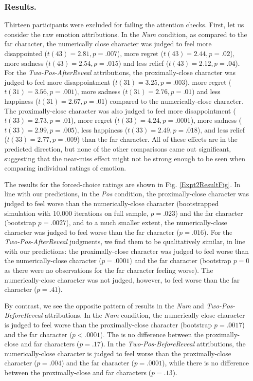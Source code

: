 \documentclass[10pt,letterpaper]{article}
\begin{document}
\subsubsection{Results.} Thirteen participants were excluded for failing the attention checks.
First, let us consider the raw emotion attributions. In the \textit{Num} condition, as compared to the far character, the numerically close character was judged to feel more disappointed ($t(43)=2.81, p=.007$), more regret ($t(43)=2.44, p=.02$), more sadness ($t(43)=2.54, p=.015$) and less relief ($t(43)=2.12, p=.04$). For the \textit{Two-Pos-AfterReveal} attributions, the proximally-close character was judged to feel more disappointment ($t(31)=3.25, p=.003$), more regret ($t(31)=3.56, p=.001$), more sadness ($t(31)=2.76, p=.01$) and less happiness ($t(31)=2.67, p=.01$) compared to the numerically-close character. The proximally-close character was also judged to feel more disappointment ($t(33)=2.73, p=.01$), more regret ($t(33)=4.24, p=.0001$), more sadness ($t(33)=2.99, p=.005$), less happiness ($t(33)=2.49, p=.018$), and less relief ($t(33)=2.77, p=.009$) than the far character. All of these effects are in the predicted direction, but none of the other comparisons came out significant, suggesting that the near-miss effect might not be strong enough to be seen when comparing individual ratings of emotion.




The results for the forced-choice ratings are shown in Fig. \ref{Expt2ResultFig}. In line with our predictions, in the \textit{Pos} condition, the proximally-close character was judged to feel worse than the numerically-close character (bootstrapped simulation with 10,000 iterations on full sample, $p=.023$) and the far character (bootstrap $p=.0027$), and to a much smaller extent, the numerically-close character was judged to feel worse than the far character ($p=.016$). For the \textit{Two-Pos-AfterReveal} judgments, we find them to be qualitatively similar, in line with our predictions: the proximally-close character was judged to feel worse than the numerically-close character ($p=.0001$) and the far character (bootstrap $p=0$ as there were no observations for the far character feeling worse). The numerically-close character was not judged, however, to feel worse than the far character ($p=.41$).

By contrast, we see the opposite pattern of results in the \textit{Num} and \textit{Two-Pos-BeforeReveal} attributions. In the \textit{Num} condition, the numerically close character is judged to feel worse than the proximally-close character (bootstrap $p=.0017$) and the far character ($p<.0001$). The is no difference between the proximally-close and far characters ($p=.17$). In the \textit{Two-Pos-BeforeReveal} attributions, the numerically-close character is judged to feel worse than the proximally-close character ($p=.004$) and the far character ($p=.0001$), while there is no difference between the proximally-close and far characters ($p=.13$).
\end{document}
